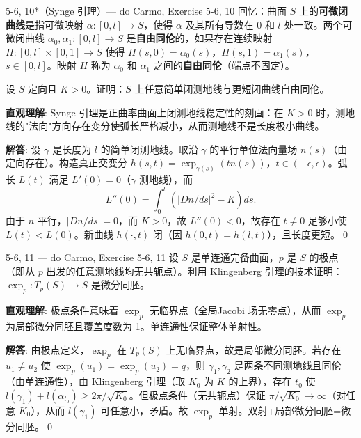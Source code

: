 \begin{exercise}{5-6, 10*（Synge 引理）— do Carmo, Exercise 5-6, 10}
回忆：曲面 $S$ 上的\textbf{可微闭曲线}是指可微映射 $\alpha: [0,l] \to S$，使得 $\alpha$ 及其所有导数在 $0$ 和 $l$ 处一致。两个可微闭曲线 $\alpha_0, \alpha_1: [0,l] \to S$ 是\textbf{自由同伦}的，如果存在连续映射 $H: [0,l] \times [0,1] \to S$ 使得 $H(s,0) = \alpha_0(s)$，$H(s,1) = \alpha_1(s)$，$s \in [0,l]$。映射 $H$ 称为 $\alpha_0$ 和 $\alpha_1$ 之间的\textbf{自由同伦}（端点不固定）。

设 $S$ 定向且 $K>0$。证明：$S$ 上任意简单闭测地线与更短闭曲线自由同伦。
\end{exercise}
\begin{solution}
\textbf{直观理解}: Synge 引理是正曲率曲面上闭测地线稳定性的刻画：在 $K>0$ 时，测地线的"法向"方向存在变分使弧长严格减小，从而测地线不是长度极小曲线。

\textbf{解答}: 设 $\gamma$ 是长度为 $l$ 的简单闭测地线。取沿 $\gamma$ 的平行单位法向量场 $n(s)$（由定向存在）。构造真正交变分 $h(s,t)=\exp_{\gamma(s)}(tn(s))$，$t\in(-\epsilon,\epsilon)$。弧长 $L(t)$ 满足 $L'(0)=0$（$\gamma$ 测地线），而
\[
L''(0)=\int_0^l\left(|D n/ds|^2-K\right)ds.
\]
由于 $n$ 平行，$|Dn/ds|=0$，而 $K>0$，故 $L''(0)<0$，故存在 $t\neq 0$ 足够小使 $L(t)<L(0)$。新曲线 $h(\cdot,t)$ 闭（因 $h(0,t)=h(l,t)$），且长度更短。\qed
\end{solution}

\begin{exercise}{5-6, 11 — do Carmo, Exercise 5-6, 11}
设 $S$ 是单连通完备曲面，$p$ 是 $S$ 的极点（即从 $p$ 出发的任意测地线均无共轭点）。利用 Klingenberg 引理的技术证明：$\exp_p: T_p(S) \to S$ 是微分同胚。
\end{exercise}
\begin{solution}
\textbf{直观理解}: 极点条件意味着 $\exp_p$ 无临界点（全局Jacobi 场无零点），从而 $\exp_p$ 为局部微分同胚且覆盖度数为 1。单连通性保证整体单射性。

\textbf{解答}: 由极点定义，$\exp_p$ 在 $T_p(S)$ 上无临界点，故是局部微分同胚。若存在 $u_1\neq u_2$ 使 $\exp_p(u_1)=\exp_p(u_2)=q$，则 $\gamma_1,\gamma_2$ 是两条不同测地线且同伦（由单连通性），由 Klingenberg 引理（取 $K_0$ 为 $K$ 的上界），存在 $t_0$ 使 $l(\gamma_1)+l(\alpha_{t_0})\geq 2\pi/\sqrt{K_0}$。但极点条件（无共轭点）保证 $\pi/\sqrt{K_0}\to\infty$（对任意 $K_0$），从而 $l(\gamma_1)$ 可任意小，矛盾。故 $\exp_p$ 单射。双射+局部微分同胚=微分同胚。\qed
\end{solution}

